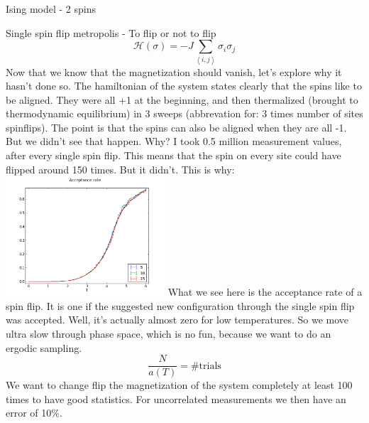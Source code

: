 \documentclass[handout]{beamer}
\begin{document}
\begin{frame}{Ising model - 2 spins}
\end{frame}

\begin{frame}{Single spin flip metropolis - To flip or not to flip}
\pause
\[ \mathscr{H}(\sigma) = -J \sum\limits_{\left< i, j \right>} \sigma_i \sigma_j \]
 {Now that we know that the magnetization should vanish, let's explore why it hasn't done so.}
 {The hamiltonian of the system states clearly that the spins like to be aligned. They were all +1 at the beginning, and then thermalized (brought to thermodynamic equilibrium) in 3 sweeps (abbrevation for: 3 times number of sites spinflips).}
 {The point is that the spins can also be aligned when they are all -1. But we didn't see that happen. Why?}
 {I took 0.5 million measurement values, after every single spin flip. This means that the spin on every site could have flipped around 150 times. But it didn't. This is why:}
\pause
\centering
\includegraphics[height=12em]{img/single_acceptanceRate.png}
	 {What we see here is the acceptance rate of a spin flip. It is one if the suggested new configuration through the single spin flip was accepted. Well, it's actually almost zero for low temperatures. So we move ultra slow through phase space, which is no fun, because we want to do an ergodic sampling.}
 {\[ \frac{N}{a(T)} = \text{\# trials} \]}
 {We want to change flip the magnetization of the system completely at least 100 times to have good statistics. For uncorrelated measurements we then have an error of 10\%.}
\end{frame}
\end{document}
